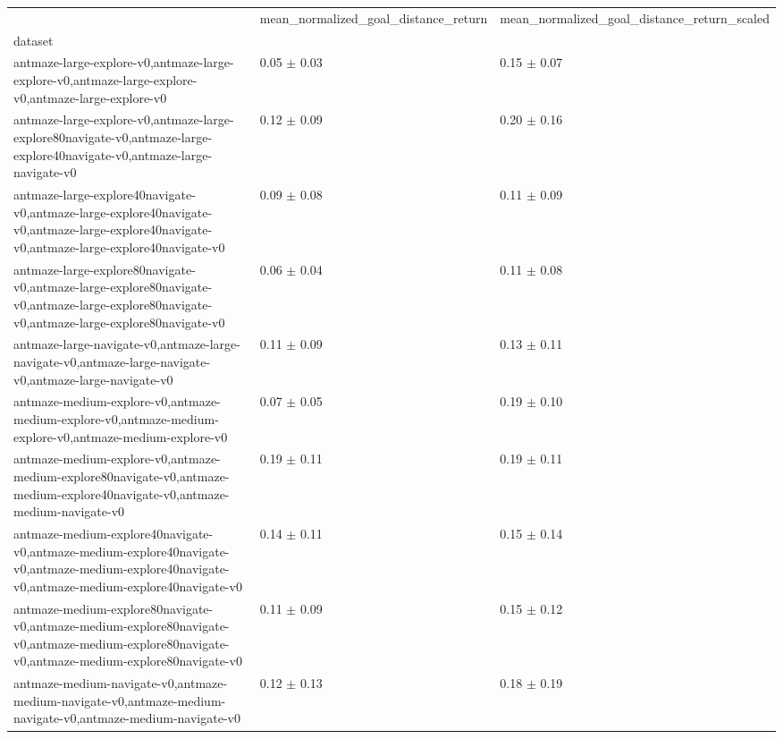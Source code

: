 \begin{tabular}{lll}
\toprule
 & mean_normalized_goal_distance_return & mean_normalized_goal_distance_return_scaled \\
dataset &  &  \\
\midrule
antmaze-large-explore-v0,antmaze-large-explore-v0,antmaze-large-explore-v0,antmaze-large-explore-v0 & 0.05 $\pm$ 0.03 & 0.15 $\pm$ 0.07 \\
antmaze-large-explore-v0,antmaze-large-explore80navigate-v0,antmaze-large-explore40navigate-v0,antmaze-large-navigate-v0 & 0.12 $\pm$ 0.09 & 0.20 $\pm$ 0.16 \\
antmaze-large-explore40navigate-v0,antmaze-large-explore40navigate-v0,antmaze-large-explore40navigate-v0,antmaze-large-explore40navigate-v0 & 0.09 $\pm$ 0.08 & 0.11 $\pm$ 0.09 \\
antmaze-large-explore80navigate-v0,antmaze-large-explore80navigate-v0,antmaze-large-explore80navigate-v0,antmaze-large-explore80navigate-v0 & 0.06 $\pm$ 0.04 & 0.11 $\pm$ 0.08 \\
antmaze-large-navigate-v0,antmaze-large-navigate-v0,antmaze-large-navigate-v0,antmaze-large-navigate-v0 & 0.11 $\pm$ 0.09 & 0.13 $\pm$ 0.11 \\
antmaze-medium-explore-v0,antmaze-medium-explore-v0,antmaze-medium-explore-v0,antmaze-medium-explore-v0 & 0.07 $\pm$ 0.05 & 0.19 $\pm$ 0.10 \\
antmaze-medium-explore-v0,antmaze-medium-explore80navigate-v0,antmaze-medium-explore40navigate-v0,antmaze-medium-navigate-v0 & 0.19 $\pm$ 0.11 & 0.19 $\pm$ 0.11 \\
antmaze-medium-explore40navigate-v0,antmaze-medium-explore40navigate-v0,antmaze-medium-explore40navigate-v0,antmaze-medium-explore40navigate-v0 & 0.14 $\pm$ 0.11 & 0.15 $\pm$ 0.14 \\
antmaze-medium-explore80navigate-v0,antmaze-medium-explore80navigate-v0,antmaze-medium-explore80navigate-v0,antmaze-medium-explore80navigate-v0 & 0.11 $\pm$ 0.09 & 0.15 $\pm$ 0.12 \\
antmaze-medium-navigate-v0,antmaze-medium-navigate-v0,antmaze-medium-navigate-v0,antmaze-medium-navigate-v0 & 0.12 $\pm$ 0.13 & 0.18 $\pm$ 0.19 \\
\bottomrule
\end{tabular}
